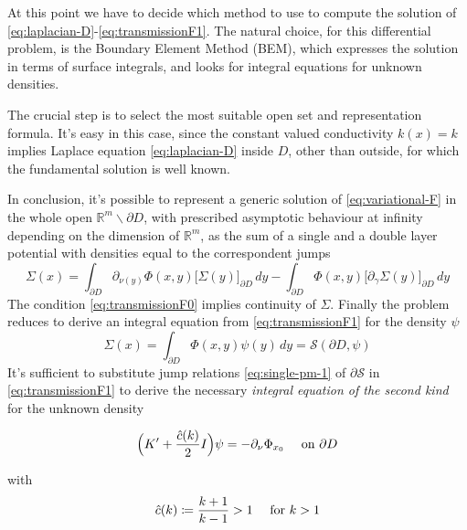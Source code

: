 \documentclass[10pt, a4paper, twoside, openright]{book}
\theoremstyle{definition}
\theoremstyle{plain}
\theoremstyle{plain}
\theoremstyle{plain}
\theoremstyle{plain}
\theoremstyle{plain}
\theoremstyle{plain}
\theoremstyle{plain}
\theoremstyle{plain}
\begin{document}
\par
At this point we have to decide which method to use to compute the solution of \ref{eq:laplacian-D}-\ref{eq:transmissionF1}. The natural choice, for this differential problem, is the Boundary Element Method (BEM), which expresses the solution in terms of surface integrals, and looks for integral equations for unknown densities. 
\par
The crucial step is to select the most suitable open set and representation formula. It's easy in this case, since the constant valued conductivity $k(x)=k$ implies Laplace equation \ref{eq:laplacian-D} inside $D$, other than outside, for which the fundamental solution is well known.
\par
In conclusion, it's possible to represent a generic solution of \ref{eq:variational-F} in the whole open $\mathbb{R}^m\backslash\partial D$, with prescribed asymptotic behaviour at infinity depending on the dimension of $\mathbb{R}^m$, as the sum of a single and a double layer potential with densities equal to the correspondent jumps 
\begin{equation}
 \Sigma(x) = \int_{\partial D}\partial_{\nu(y)}\Phi(x,y)\bigl[\Sigma(y)\bigr]_{\partial D}\,dy-\int_{\partial D}\Phi(x,y)\bigl[\partial_\gamma \Sigma(y)\bigr]_{\partial D}\,dy
\end{equation}
The condition \ref{eq:transmissionF0} implies continuity of $\Sigma$. Finally the problem reduces to derive an integral equation from \ref{eq:transmissionF1} for the density $\psi$
\begin{equation}
 \Sigma(x)=\int_{\partial D}\Phi(x,y)\psi(y)\,dy = \mathcal{S}(\partial D, \psi)
\end{equation}
It's sufficient to substitute jump relations \ref{eq:single-pm-1} of $\partial\mathcal{S}$ in \ref{eq:transmissionF1} to derive the necessary \emph{integral equation of the second kind} for the unknown density
\begin{center}
\colorbox{light-gray}{\color{black}\parbox{\textwidth}{
\begin{equation}
 \label{eq:eq-psi-ck}
 \Bigl(K' + \frac{\hat{c}(k)}{2} I\Bigr)\psi = -\partial_\nu \Phi_{x_0}\quad\textup{ on }\partial D
\end{equation}
}}
\end{center}
with 
\begin{equation}
 \hat{c}(k)\coloneqq\dfrac{k+1}{k-1} > 1 \quad \textup{ for } k>1
\end{equation}
\end{document}
